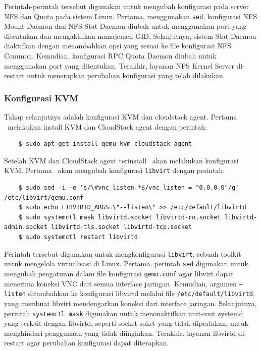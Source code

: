 Perintah-perintah tersebut digunakan untuk mengubah konfigurasi pada server NFS dan Quota pada sistem Linux. Pertama, menggunakan \texttt{sed}, konfigurasi NFS Mount Daemon dan NFS Stat Daemon diubah untuk menggunakan port yang ditentukan dan mengaktifkan manajemen GID. Selanjutnya, sistem Stat Daemon diaktifkan dengan menambahkan opsi yang sesuai ke file konfigurasi NFS Common. Kemudian, konfigurasi RPC Quota Daemon diubah untuk menggunakan port yang ditentukan. Terakhir, layanan NFS Kernel Server di-restart untuk menerapkan perubahan konfigurasi yang telah dilakukan.

\subsubsection{Konfigurasi KVM}
Tahap selanjutnya adalah konfigurasi KVM dan cloudstack agent. Pertama \saya\ melakukan install KVM dan CloudStack agent dengan perintah:

\begin{listing}[H]
    \begin{verbatim}       
    $ sudo apt-get install qemu-kvm cloudstack-agent
    \end{verbatim}
\end{listing}

Setelah KVM dan CloudStack agent terinstall \saya\ akan melakukan konfigurasi KVM. Pertama \saya\ akan mengubah konfigurasi \texttt{libvirt} dengan perintah:

\begin{listing}[H]
    \begin{verbatim}       
    $ sudo sed -i -e 's/\#vnc_listen.*$/vnc_listen = "0.0.0.0"/g' /etc/libvirt/qemu.conf
    $ sudo echo LIBVIRTD_ARGS=\"--listen\" >> /etc/default/libvirtd
    $ sudo systemctl mask libvirtd.socket libvirtd-ro.socket libvirtd-admin.socket libvirtd-tls.socket libvirtd-tcp.socket
    $ sudo systemctl restart libvirtd
    \end{verbatim}
\end{listing}

Perintah tersebut digunakan untuk mengkonfigurasi \texttt{libvirt}, sebuah toolkit untuk mengelola virtualisasi di Linux. Pertama, perintah \texttt{sed} digunakan untuk mengubah pengaturan dalam file konfigurasi \texttt{qemu.conf} agar libvirt dapat menerima koneksi VNC dari semua interface jaringan. Kemudian, argumen \texttt{--listen} ditambahkan ke konfigurasi libvirtd melalui file \texttt{/etc/default/libvirtd}, yang membuat libvirt mendengarkan koneksi dari interface jaringan. Selanjutnya, perintah \texttt{systemctl mask} digunakan untuk menonaktifkan unit-unit systemd yang terkait dengan libvirtd, seperti socket-soket yang tidak diperlukan, untuk menghindari penggunaan yang tidak diinginkan. Terakhir, layanan libvirtd di-restart agar perubahan konfigurasi dapat diterapkan.

